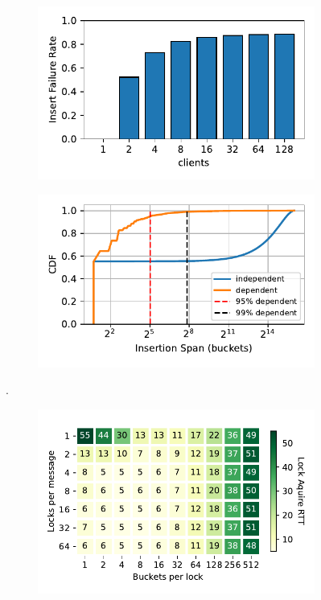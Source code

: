 \begin{figure}[t]
    \centering
    \begin{subfigure}{0.3\linewidth}
        \includegraphics[width=0.99\linewidth]{fig/optimistic_failures.pdf}
    \end{subfigure}
    \begin{subfigure}{0.3\linewidth}
        \includegraphics[width=0.99\linewidth]{fig/insertion_span.pdf}
        \label{fig:insertion_span}
    \end{subfigure}.
    \begin{subfigure}{0.3\linewidth}
        \includegraphics[width=0.99\linewidth]{fig/buckets_per_lock_vs_locks_per_message.pdf}

\end{subfigure}
\end{figure}
